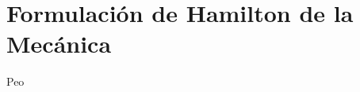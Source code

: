 \documentclass[../main.tex]{subfiles}
\begin{document}
\section{Formulación de Hamilton de la Mecánica}
Peo
\end{document}
